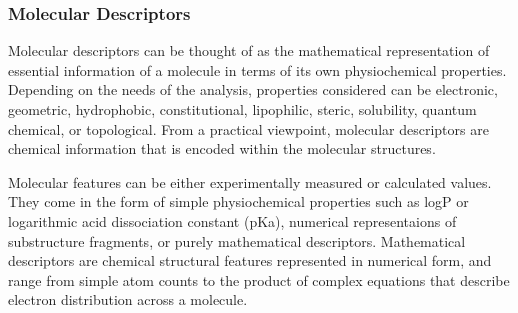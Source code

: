 
\subsubsection{Molecular Descriptors}
Molecular descriptors can be thought of as the mathematical representation of essential information of a molecule in terms of its own physiochemical properties. Depending on the needs of the analysis, properties considered can be electronic, geometric, hydrophobic, constitutional, lipophilic, steric, solubility, quantum chemical, or topological. From a practical viewpoint, molecular descriptors are chemical information that is encoded within the molecular structures. \cite{Nantasenamat2009}


Molecular features can be either experimentally measured or calculated values. They come in the form of simple physiochemical properties such as logP or logarithmic acid dissociation constant (pKa), numerical representaions of substructure fragments, or purely mathematical descriptors. Mathematical descriptors are chemical structural features represented in numerical form, and range from simple atom counts to the product of complex equations that describe electron distribution across a molecule. \cite{Kruhlak2012}

